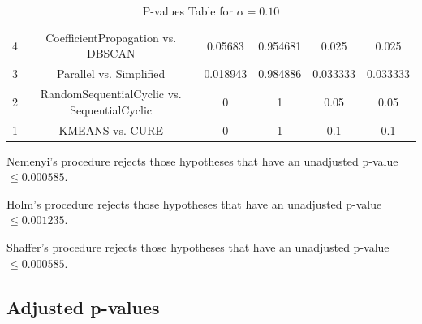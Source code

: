 \documentclass[a4paper,10pt]{article}
\begin{document}
\begin{landscape}
\begin{table}[!htp]
\begin{tabular}{cccccc}
4&CoefficientPropagation vs. DBSCAN&0.05683&0.954681&0.025&0.025\\
3&Parallel vs. Simplified&0.018943&0.984886&0.033333&0.033333\\
2&RandomSequentialCyclic vs. SequentialCyclic&0&1&0.05&0.05\\
1&KMEANS vs. CURE&0&1&0.1&0.1\\
\hline
\end{tabular}
\caption{P-values Table for $\alpha=0.10$}
\end{table}Nemenyi's procedure rejects those hypotheses that have an unadjusted p-value $\le0.000585$.

Holm's procedure rejects those hypotheses that have an unadjusted p-value $\le0.001235$.

Shaffer's procedure rejects those hypotheses that have an unadjusted p-value $\le0.000585$.

\pagebreak

\subsection{Adjusted p-values}


\end{landscape}
\end{document}
